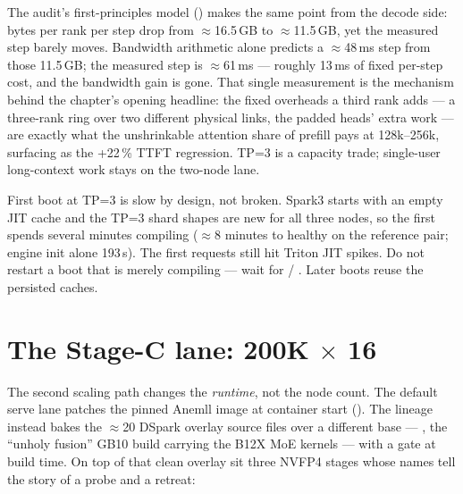 The audit's first-principles model () makes the same
point from the decode side: bytes per rank per step drop from
$\approx$16.5\,GB to $\approx$11.5\,GB, yet the measured step barely
moves.
Bandwidth arithmetic alone predicts a $\approx$48\,ms step from those
11.5\,GB; the measured step is $\approx$61\,ms --- roughly 13\,ms of fixed
per-step cost, and the bandwidth gain is gone. That single measurement is
the mechanism behind the chapter's opening headline: the fixed overheads a
third rank adds --- a three-rank ring over two different physical links,
the padded heads' extra work --- are exactly what the unshrinkable
attention share of prefill pays at 128k--256k, surfacing as the +22\,\%
TTFT regression. TP=3 is a capacity trade; single-user long-context work
stays on the two-node lane.

\begin{hbnote}
First boot at TP=3 is slow by design, not broken. Spark3 starts with an empty
JIT cache and the TP=3 shard shapes are new for all three nodes, so the first
 spends several minutes compiling ($\approx$8 minutes
to healthy on the reference pair; engine init alone 193\,s). The first
requests still hit Triton JIT spikes. Do not restart a boot that is merely
compiling --- wait for  / . Later
boots reuse the persisted caches.
\end{hbnote}

\section{The Stage-C lane: 200K $\times$ 16}

The second scaling path changes the \emph{runtime}, not the node count. The
default serve lane patches the pinned Anemll image at container start
(). The  lineage instead bakes the
$\approx$20 DSpark overlay source files over a different base ---
, the
``unholy fusion'' GB10 build carrying the B12X MoE kernels --- with a
 gate at build time. On top of that clean overlay sit three
NVFP4 stages whose names tell the story of a probe and a retreat:

